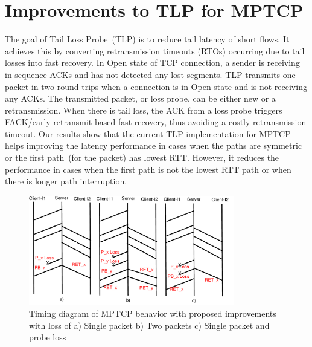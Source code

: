 \documentclass[10pt,conference]{IEEEtran}
\begin{document}
\section{Improvements to TLP for MPTCP}\label{impr}
The goal of Tail Loss Probe~(TLP) is to reduce tail latency of short flows. It achieves this by converting retransmission timeouts (RTOs) occurring
due to tail losses into fast recovery. In Open state of TCP connection, a sender is receiving in-sequence ACKs and has not detected any lost segments.
TLP transmits one packet in two round-trips when a connection is in Open state and is not receiving any ACKs. The transmitted packet, or loss probe, 
can be either new or a retransmission. When there is tail loss, the ACK from a loss probe triggers FACK/early-retransmit based fast recovery, thus 
avoiding a costly retransmission timeout. Our results show that the current TLP implementation for MPTCP helps improving the latency performance in 
cases when the paths are symmetric or the first path~(for the packet) has lowest RTT. However, it reduces the performance in cases when the first path 
is not the lowest RTT path or when there is longer path interruption.

\begin{figure}
\begin{center}
    \includegraphics[angle=0, width=0.8\textwidth]{images/timingER3NewTLP1}
\end{center}
\caption{Timing diagram of MPTCP behavior with proposed improvements with loss of a) Single packet b) Two packets c) Single packet and probe loss}\label{timingNew}
\end{figure}
\end{document}
